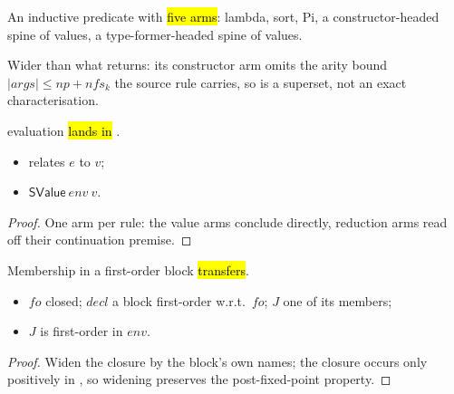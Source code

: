 \begin{definition}
\label{def:SValue}
\leanok
{}
 An inductive predicate with \hl{five arms}: lambda, sort, Pi, a constructor-headed spine
of values, a type-former-headed spine of values.
\end{definition}

\begin{remark}
 Wider than what \SEval{} returns: its constructor arm omits the arity bound
$|args|\le np+nfs_k$ the source rule carries, so  is a superset, not an exact
characterisation.
\end{remark}

\begin{lemma}
\label{lem:SEval-svalue}
\leanok
{}
 \SEval{} evaluation \hl{lands in }.
\begin{itemize}
\item {} \SEval{} relates $e$ to $v$;
\item {} $\mathsf{SValue}\ env\ v$.
\end{itemize}
\end{lemma}
\begin{proof}
\leanok
{}
 One arm per rule: the value arms conclude directly, reduction arms read off their
continuation premise.
\end{proof}

\begin{lemma}
\label{lem:firstOrderInd_of_own}
\leanok
{}
 Membership in a first-order block \hl{transfers}.
\begin{itemize}
\item {} $fo$ closed; $\mathit{decl}$ a block first-order w.r.t.\ $fo$; $J$ one of its members;
\item {} $J$ is first-order in $env$.
\end{itemize}
\end{lemma}
\begin{proof}
\leanok
{}
 Widen the closure by the block's own names; the closure occurs only positively in
, so widening preserves the post-fixed-point property.
\end{proof}

